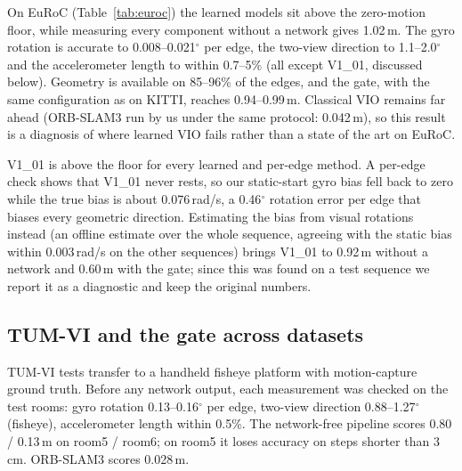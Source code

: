 \documentclass[letterpaper,journal]{IEEEtran}
\begin{document}
On EuRoC (Table~\ref{tab:euroc}) the learned models sit above the zero-motion floor, while measuring every component without a network gives 1.02\,m. The gyro rotation is accurate to 0.008--0.021$^\circ$ per edge, the two-view direction to 1.1--2.0$^\circ$ and the accelerometer length to within 0.7--5\% (all except V1\_01, discussed below). Geometry is available on 85--96\% of the edges, and the gate, with the same configuration as on KITTI, reaches 0.94--0.99\,m. Classical VIO remains far ahead (ORB-SLAM3 run by us under the same protocol: 0.042\,m), so this result is a diagnosis of where learned VIO fails rather than a state of the art on EuRoC.

V1\_01 is above the floor for every learned and per-edge method. A per-edge check shows that V1\_01 never rests, so our static-start gyro bias fell back to zero while the true bias is about 0.076\,rad/s, a 0.46$^\circ$ rotation error per edge that biases every geometric direction. Estimating the bias from visual rotations instead (an offline estimate over the whole sequence, agreeing with the static bias within 0.003\,rad/s on the other sequences) brings V1\_01 to 0.92\,m without a network and 0.60\,m with the gate; since this was found on a test sequence we report it as a diagnostic and keep the original numbers.

\subsection{TUM-VI and the gate across datasets}
\label{sec:gate}

TUM-VI tests transfer to a handheld fisheye platform with motion-capture ground truth. Before any network output, each measurement was checked on the test rooms: gyro rotation 0.13--0.16$^\circ$ per edge, two-view direction 0.88--1.27$^\circ$ (fisheye), accelerometer length within 0.5\%. The network-free pipeline scores 0.80 / 0.13\,m on room5 / room6; on room5 it loses accuracy on steps shorter than 3\,cm. ORB-SLAM3 scores 0.028\,m.
\end{document}
